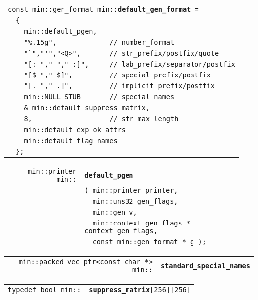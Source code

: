 \documentclass[12pt]{article}
\makeatletter
\newcommand{\TT}[1]{{\tt \bfseries #1}}
\newcommand{\ttkey}[1]{\TT{#1}\index{#1@{\tt #1}}}
\newcommand{\ttindex}[1]{\index{#1@{\tt #1}}}
\newcommand{\minindex}[1]{\ttindex{min::#1}\ttindex{#1}}
\newcommand{\EOL}{\penalty \exhyphenpenalty}
\newenvironment{indpar}[1][0.3in]%
	{\begin{list}{}%
		     {\setlength{\itemsep}{0in}%
		      \setlength{\topsep}{0in}%
		      \setlength{\parsep}{1ex}%
		      \setlength{\labelwidth}{#1}%
		      \setlength{\leftmargin}{#1}%
		      \addtolength{\leftmargin}{\labelsep}}%
	 \item}%
	{\end{list}}
\newcommand{\LABEL}[1]{\label{#1}}
\newlength{\ARGBREAKLENGTH}
\newcommand{\ARGBREAK}[1][\ARGBREAKLENGTH]{\\&\hspace*{#1}}
\newcommand{\TTKEY}[1]{\ttkey{#1}}
\newcommand{\MINKEY}[1]{{\tt \bf #1}\minindex{#1}}
\makeatother
\begin{document}
\begin{indpar}[1em]\begin{tabular}{r@{}l}
\multicolumn{2}{l}{\tt const min::gen\_format
                       min::\MINKEY{default\_gen\_format} =}\ARGBREAK
    \verb|{|\ARGBREAK
    \verb|  min::default_pgen,|\ARGBREAK
    \verb|  "%.15g",             // number_format|\ARGBREAK
    \verb|  "`","'","<Q>",       // str_prefix/postfix/quote|\ARGBREAK
    \verb|  "[: "," "," :]",     // lab_prefix/separator/postfix|\ARGBREAK
    \verb|  "[$ "," $]",         // special_prefix/postfix|\ARGBREAK
    \verb|  "[. "," .]",         // implicit_prefix/postfix|\ARGBREAK
    \verb|  min::NULL_STUB       // special_names|\ARGBREAK
    \verb|  & min::default_suppress_matrix,|\ARGBREAK
    \verb|  8,                   // str_max_length|\ARGBREAK
    \verb|  min::default_exp_ok_attrs|\ARGBREAK
    \verb|  min::default_flag_names|\ARGBREAK
    \verb|};|
\LABEL{MIN::DEFAULT_GEN_FORMAT} \\
\end{tabular}\end{indpar}

\begin{indpar}[1em]\begin{tabular}{r@{}l}
\verb|min::printer min::| & \MINKEY{default\_pgen}\ARGBREAK
    \verb|( min::printer printer,|\ARGBREAK
    \verb|  min::uns32 gen_flags,|\ARGBREAK
    \verb|  min::gen v,|\ARGBREAK
    \verb|  min::context_gen_flags * context_gen_flags,|\ARGBREAK
    \verb|  const min::gen_format * g );|
\LABEL{MIN::DEFAULT_PGEN} \\
\end{tabular}\end{indpar}

\begin{indpar}[1em]\begin{tabular}{r@{}l}
\verb|min::packed_vec_ptr<const char *> min::|
    & \TTKEY{standard\_\EOL special\_\EOL names}
\LABEL{MIN::STANDARD_SPECIAL_NAMES} \\
\end{tabular}\end{indpar}

\begin{indpar}[1em]\begin{tabular}{r@{}l}
\verb|typedef bool min::| & \MINKEY{suppress\_matrix}\verb|[256][256]|
\LABEL{MIN::SUPPRESS_MATRIX} \\
\end{tabular}\end{indpar}
\end{document}
